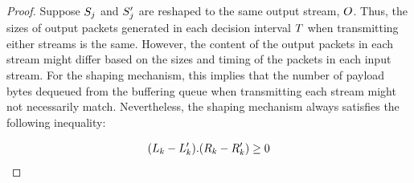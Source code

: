 \begin{proof}
    Suppose $S_{j}$ and $S_{j}'$ are reshaped to the same output stream,
    $O$. Thus, the sizes of output packets generated in each decision
    interval $T$ when transmitting either streams is the same. However, the
    content of the output packets in each stream might differ based on the sizes and
    timing of the packets in each input stream.
    For the shaping mechanism, this implies that the number of payload bytes
    dequeued from the buffering queue when transmitting each stream might not
    necessarily match.
    Nevertheless, the shaping mechanism always satisfies the following inequality:
    
    \begin{equation}\label{equ:queue-dequeue}
            (L_{k} - L_{k}').({R}_{k} - {R}_{k}') \geq 0
    \end{equation}
    

\end{proof}
